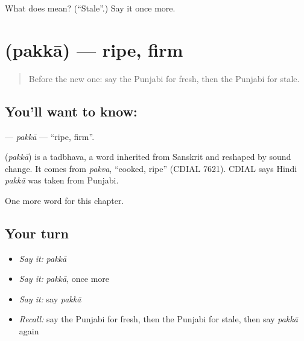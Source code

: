 \begin{tcolorbox}[breakable,colback=teal!4,colframe=teal!35!black,title={Before you move on}]
What does  mean? (\textquotedblleft{}Stale\textquotedblright{}.) Say it once more.
\end{tcolorbox}
\section[\texorpdfstring{\pa{ਪੱਕਾ} (pakkā)}{ਪੱਕਾ (pakkā)}]{ (pakkā) — ripe, firm}

\label{lesson:PA-C146-pakka}



\begin{quote}
Before the new one: say the Punjabi for fresh, then the Punjabi for stale.
\end{quote}

\subsection*{You'll want to know: }
\textbf{} — \emph{pakkā} — \textquotedblleft{}ripe, firm\textquotedblright{}.

\begin{cousinweb}
\textbf{} (\emph{pakkā}) is a tadbhava, a word inherited from Sanskrit and reshaped by sound change. It comes from \emph{pakva}, \textquotedblleft{}cooked, ripe\textquotedblright{} (CDIAL 7621). CDIAL says Hindi \emph{pakkā} was taken from Punjabi.
\end{cousinweb}

\begin{grammarlens}[title={What you've built}]
One more word for this chapter.
\end{grammarlens}

\subsection*{Your turn}
\begin{itemize}
\raggedright
  \item \emph{Say it:} \emph{pakkā}
  \item \emph{Say it:} \emph{pakkā}, once more
  \item \emph{Say it:} say \emph{pakkā}
  \item \emph{Recall:} say the Punjabi for fresh, then the Punjabi for stale, then say \emph{pakkā} again
\end{itemize}

